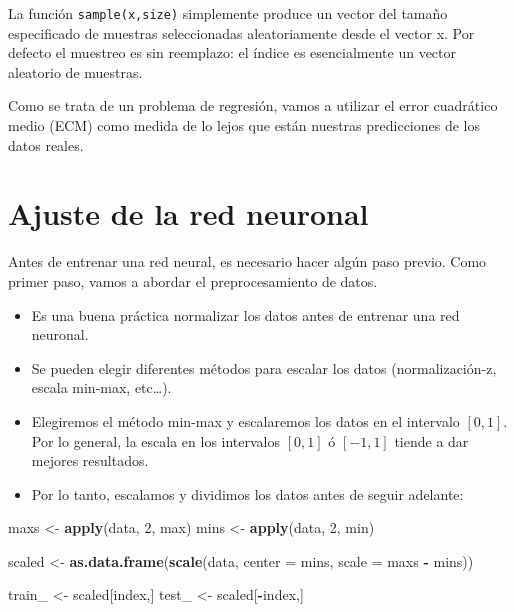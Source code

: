 \documentclass[]{book}
\newenvironment{Shaded}{\begin{snugshade}}{\end{snugshade}}
\newcommand{\KeywordTok}[1]{\textcolor[rgb]{0.13,0.29,0.53}{\textbf{#1}}}
\newcommand{\DataTypeTok}[1]{\textcolor[rgb]{0.13,0.29,0.53}{#1}}
\newcommand{\DecValTok}[1]{\textcolor[rgb]{0.00,0.00,0.81}{#1}}
\newcommand{\StringTok}[1]{\textcolor[rgb]{0.31,0.60,0.02}{#1}}
\newcommand{\OperatorTok}[1]{\textcolor[rgb]{0.81,0.36,0.00}{\textbf{#1}}}
\newcommand{\NormalTok}[1]{#1}
\begin{document}
La función \texttt{sample(x,size)} simplemente produce un vector del
tamaño especificado de muestras seleccionadas aleatoriamente desde el
vector x. Por defecto el muestreo es sin reemplazo: el índice es
esencialmente un vector aleatorio de muestras.

Como se trata de un problema de regresión, vamos a utilizar el error
cuadrático medio (ECM) como medida de lo lejos que están nuestras
predicciones de los datos reales.

\section{Ajuste de la red neuronal}\label{ajuste-de-la-red-neuronal}

Antes de entrenar una red neural, es necesario hacer algún paso previo.
Como primer paso, vamos a abordar el preprocesamiento de datos.

\begin{itemize}
\item
  Es una buena práctica normalizar los datos antes de entrenar una red
  neuronal.
\item
  Se pueden elegir diferentes métodos para escalar los datos
  (normalización-z, escala min-max, etc\ldots{}).
\item
  Elegiremos el método min-max y escalaremos los datos en el intervalo
  \([0,1]\). Por lo general, la escala en los intervalos \([0,1]\) ó
  \([-1,1]\) tiende a dar mejores resultados.
\item
  Por lo tanto, escalamos y dividimos los datos antes de seguir
  adelante:
\end{itemize}

\begin{Shaded}
\begin{Highlighting}[]
\NormalTok{maxs <-}\StringTok{ }\KeywordTok{apply}\NormalTok{(data, }\DecValTok{2}\NormalTok{, max)}
\NormalTok{mins <-}\StringTok{ }\KeywordTok{apply}\NormalTok{(data, }\DecValTok{2}\NormalTok{, min)}

\NormalTok{scaled <-}\StringTok{ }\KeywordTok{as.data.frame}\NormalTok{(}\KeywordTok{scale}\NormalTok{(data, }\DataTypeTok{center =}\NormalTok{ mins, }\DataTypeTok{scale =}\NormalTok{ maxs }\OperatorTok{-}\StringTok{ }\NormalTok{mins))}

\NormalTok{train_ <-}\StringTok{ }\NormalTok{scaled[index,]}
\NormalTok{ test_ <-}\StringTok{ }\NormalTok{scaled[}\OperatorTok{-}\NormalTok{index,]}
\end{Highlighting}
\end{Shaded}
\end{document}
